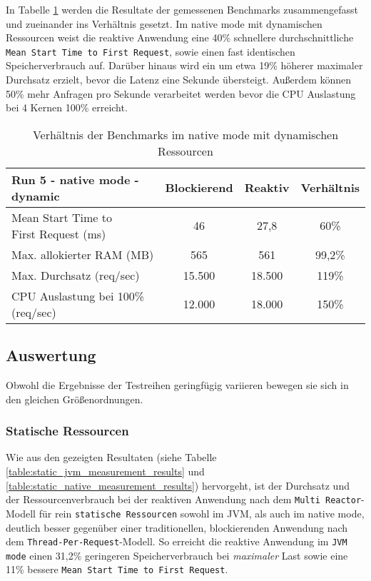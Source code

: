 In Tabelle \ref{table:dynamic_native_measurement_results} werden die Resultate der gemessenen Benchmarks zusammengefasst
und zueinander ins Verhältnis gesetzt. Im native mode mit dynamischen Ressourcen weist die reaktive Anwendung
eine 40\% schnellere durchschnittliche \verb|Mean Start Time to First Request|, sowie einen fast identischen
Speicherverbrauch auf.
Darüber hinaus wird ein um etwa 19\% höherer maximaler Durchsatz erzielt, bevor die Latenz eine Sekunde übersteigt.
Außerdem können 50\% mehr Anfragen pro Sekunde verarbeitet werden bevor die CPU Auslastung bei 4 Kernen 100\% erreicht.

\begin{table}[ht!]
  \begin{tabular}{|l | c | c | c|}
    \hline
    Run 5 - native mode - dynamic & Blockierend & Reaktiv & Verhältnis \\
    \hline
    \makecell[l]{Mean Start Time to                                    \\ First Request (ms)} &   46    &  27,8 &   60\%   \\
    \hline
    Max. allokierter RAM (MB)     & 565         & 561     & 99,2\%     \\
    \hline
    Max. Durchsatz (req/sec)      & 15.500      & 18.500  & 119\%      \\
    \hline
    \makecell[l]{CPU Auslastung bei 100\%                              \\(req/sec)} & 12.000 & 18.000 & 150\%  \\
    \hline
  \end{tabular}
  \caption{Verhältnis der Benchmarks im native mode mit dynamischen Ressourcen}
  \label{table:dynamic_native_measurement_results}
\end{table}
\newpage
\subsection{Auswertung}
\label{subsubsec:auswertung}
Obwohl die Ergebnisse der Testreihen geringfügig variieren bewegen sie sich in den gleichen Größenordnungen.
\subsubsection{Statische Ressourcen}
\label{subsubsec:auswertung_static}
Wie aus den gezeigten Resultaten (siehe Tabelle \ref{table:static_jvm_measurement_results} und
\ref{table:static_native_measurement_results}) hervorgeht, ist der Durchsatz und der Ressourcenverbrauch bei der
reaktiven Anwendung nach dem \verb|Multi Reactor|-Modell für rein \verb|statische Ressourcen| sowohl im JVM, als auch im native mode,
deutlich besser gegenüber einer traditionellen, blockierenden Anwendung nach dem \verb|Thread-Per-Request|-Modell.\newline
So erreicht die reaktive Anwendung im \verb|JVM mode| einen 31,2\% geringeren Speicherverbrauch bei \textit{maximaler} Last
sowie eine 11\% bessere \verb|Mean Start Time to First Request|.

